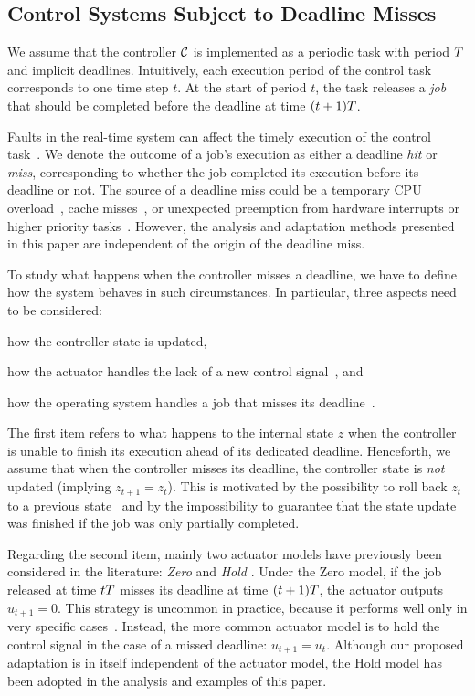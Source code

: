 \subsection{Control Systems Subject to Deadline Misses}

We assume that the controller $\mathcal{C}$ is implemented as a periodic task with period $T$ and implicit deadlines. 
Intuitively, each execution period of the control task corresponds to one time step $t$.
At the start of period $t$, the task releases a \emph{job} that should be completed before the deadline at time $(t+1) T$.

Faults in the real-time system can affect the timely execution of the control task~\cite{Steinbauer:2013}.
We denote the outcome of a job's execution as either a deadline \emph{hit} or \emph{miss}, corresponding to whether the job completed its execution before its deadline or not. 
The source of a deadline miss could be a temporary CPU overload~\cite{Baruah:1997}, cache misses~\cite{Milligan:1996, Wang:2012},  or unexpected preemption from hardware interrupts or higher priority tasks~\cite{Stankovic:1995}.
However, the analysis and adaptation methods presented in this paper are independent of the origin of the deadline miss.

To study what happens when the controller misses a deadline, we have to define how the system behaves in such circumstances.
In particular, three aspects need to be considered: 
\begin{enumerate*}[label=(\roman*)]
    \item how the controller state is updated, 
    \item how the actuator handles the lack of a new control signal~\cite{Schenato:2009}, and
    \item how the operating system handles a job that misses its deadline~\cite{Pazzaglia:2019, Cervin:2005}.
\end{enumerate*}
The first item refers to what happens to the internal state $z$ when the controller is unable to finish its execution ahead of its dedicated deadline.
Henceforth, we assume that when the controller misses its deadline, the controller state is \emph{not} updated (implying $z_{t+1} = z_t$). 
This is motivated by the possibility to roll back $z_t$ to a previous state~\cite{akesson:2020, Seong:2001, Zhang:2003} and by the impossibility to guarantee that the state update was finished if the job was only partially completed.

Regarding the second item, mainly two actuator models have previously been considered in the literature: \emph{Zero} and \emph{Hold} \cite{Schenato:2009}.
Under the Zero model, if the job released at time $tT$ misses its deadline at time  $(t+1)T$, the actuator outputs $u_{t+1} = 0$.
This strategy is uncommon in practice, because it performs well only in very specific cases~\cite{Vreman:2021ecrts}. 
Instead, the more common actuator model is to hold the control signal in the case of a missed deadline: $u_{t+1} = u_t$.
Although our proposed adaptation is in itself independent of the actuator model, the Hold model has been adopted in the analysis and examples of this paper.


